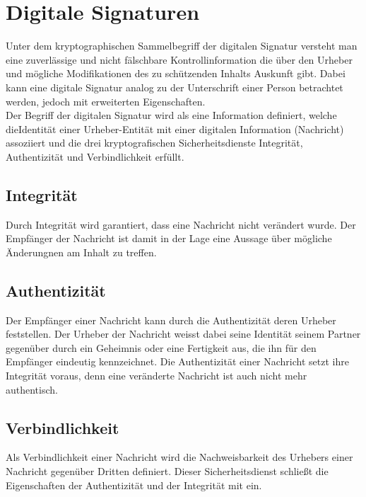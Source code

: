\section{Digitale Signaturen}
\label{sec:GrundlagenDefinitionen:DigitaleSignaturen}
Unter dem kryptographischen Sammelbegriff der digitalen Signatur versteht man eine zuverlässige und nicht fälschbare Kontrollinformation die über den Urheber
und mögliche Modifikationen des zu schützenden Inhalts Auskunft gibt\cite{kits}. Dabei kann eine digitale Signatur analog zu der Unterschrift einer Person
betrachtet werden\cite{esig:bsi}, jedoch mit erweiterten Eigenschaften.\\
Der Begriff der digitalen Signatur wird als eine Information definiert, welche dieIdentität einer Urheber-Entität mit einer digitalen Information (Nachricht)
assoziiert und die drei kryptografischen Sicherheitsdienste Integrität, Authentizität und Verbindlichkeit erfüllt\cite{hac}.

\subsection{Integrität}
\label{sec:GrundlagenDefinitionen:DigitaleSignaturen:Integrität}
Durch Integrität wird garantiert, dass eine Nachricht nicht verändert wurde\cite{niag}. Der Empfänger der Nachricht ist damit in der Lage eine Aussage über
mögliche Änderungnen am Inhalt zu treffen.

\subsection{Authentizität}
\label{sec:GrundlagenDefinitionen:DigitaleSignaturen:Authentizität}
Der Empfänger einer Nachricht kann durch die Authentizität deren Urheber feststellen. Der Urheber der Nachricht weisst dabei seine Identität seinem
Partner gegenüber durch ein Geheimnis oder eine Fertigkeit aus, die ihn für den Empfänger eindeutig kennzeichnet. Die Authentizität einer Nachricht setzt ihre
Integrität voraus, denn eine veränderte Nachricht ist auch nicht mehr authentisch\cite{kits}.

\subsection{Verbindlichkeit}
\label{sec:GrundlagenDefinitionen:DigitaleSignaturen:Verbindlichkeit}
Als Verbindlichkeit einer Nachricht wird die Nachweisbarkeit des Urhebers einer Nachricht gegenüber Dritten definiert. Dieser Sicherheitsdienst schließt die
Eigenschaften der Authentizität und der Integrität mit ein\cite{kits}.

